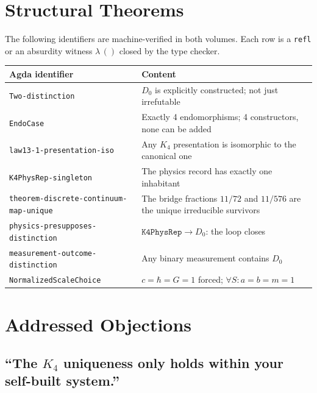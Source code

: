 \documentclass[11pt,a4paper]{article}
\theoremstyle{definition}
\begin{document}
\section{Structural Theorems}
\label{sec:structural}

The following identifiers are machine-verified in both volumes.  Each row is
a \texttt{refl} or an absurdity witness $\lambda\,()$ closed by the type
checker.

\begin{center}
\small
\renewcommand{\arraystretch}{1.3}
\begin{tabular}{@{}lp{8cm}@{}}
\toprule
\textbf{Agda identifier} & \textbf{Content} \\
\midrule
\texttt{Two-distinction}                          & $D_0$ is explicitly constructed; not just irrefutable \\
\texttt{EndoCase}                                 & Exactly 4 endomorphisms; 4 constructors, none can be added \\
\texttt{law13-1-presentation-iso}                 & Any $K_4$ presentation is isomorphic to the canonical one \\
\texttt{K4PhysRep-singleton}                      & The physics record has exactly one inhabitant \\
\texttt{theorem-discrete-continuum-map-unique}    & The bridge fractions $11/72$ and $11/576$ are the unique irreducible survivors \\
\texttt{physics-presupposes-distinction}          & $\mathtt{K4PhysRep} \to D_0$: the loop closes \\
\texttt{measurement-outcome-distinction}          & Any binary measurement contains $D_0$ \\
\texttt{NormalizedScaleChoice}                    & $c = \hbar = G = 1$ forced; $\forall S: a = b = m = 1$ \\
\bottomrule
\end{tabular}
\end{center}

\section{Addressed Objections}
\label{sec:objections}

\subsection*{``The $K_4$ uniqueness only holds within your self-built system.''}
\end{document}
